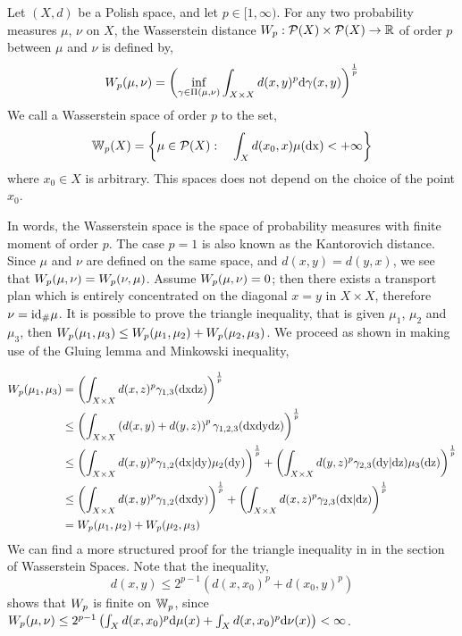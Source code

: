 \begin{definition}
	Let $(X,d)$ be a Polish space, and let $p\in[1,\infty)$. 
	For any two probability measures $\mu$, $\nu$ on $X$, the Wasserstein distance $W_{p}:\mathcal{P}(X)\times\mathcal{P}
	(X)\to\mathbb{R}$ of order $p$ between $\mu$ and $\nu$ is defined by,
	\begin{equation}
		W_{p}(\mu, \nu)=\left( \inf_{\gamma\in \Pi(\mu, \nu)}\int_{X\times X}d(x,y)^p\mathrm{d}\gamma(x,y) \right)^{\frac{1}{p}}
	\end{equation}
	We call a Wasserstein space of order $p$ to the set, \begin{equation}
	\mathbb{W}_{p}(X)=\left\lbrace \mu\in\mathcal{P}(X):\quad \int_{X}d(x_0,x)\mu(\mathrm{dx})<+\infty \right\rbrace
	\end{equation}
	where $x_0\in X$ is arbitrary. This spaces does not depend on the choice of the point $x_0$. 
\end{definition}
In words, the Wasserstein space is the space of probability measures with finite moment of order $p$. The case $p=1$ is also known as the Kantorovich distance. Since $\mu$ and $\nu$ are defined on the same space, and $d(x,y)=d(y,x)$, we see that $W_{p}(\mu,\nu)=W_{p}(\nu,\mu)$. Assume $W_{p}(\mu, \nu)=0$; then there exists a transport plan which is entirely concentrated on the diagonal $x=y$ in $X\times X$, therefore $\nu={\mathrm{id}}_{\#} \mu$. It is possible to prove the triangle inequality, that is given $\mu_1$, $\mu_2$ and $\mu_3$, then $W_{p}(\mu_1,\mu_3)\leq W_{p}(\mu_1, \mu_2)+W_{p}(\mu_2, \mu_3)$. We proceed as shown in \cite{Villani2008OT} making use of the Gluing lemma and Minkowski inequality,

\begin{align}
	W_{p}(\mu_1, \mu_3)&=\left( \int_{X\times X}d(x,z)^p\gamma_{1,3}(\mathrm{dx}\mathrm{dz}) \right)^{\frac{1}{p}}\\
	&\leq\left( \int_{X\times X}\left( d(x,y)+d(y,z) \right)^p\gamma_{1,2,3}(\mathrm{dx}\mathrm{dy} \mathrm{dz}) \right)^{\frac{1}{p}}\\
	&\leq\left( \int_{X\times X}d(x,y)^p\gamma_{1,2}(\mathrm{dx} |\mathrm{dy})\mu_2(\mathrm{dy}) \right)^{\frac{1}{p}}+\left( \int_{X\times X}d(y,z)^p\gamma_{2,3}(\mathrm{dy}| \mathrm{dz})\mu_3(\mathrm{dz}) \right)^{\frac{1}{p}}\\
	&\leq\left( \int_{X\times X}d(x,y)^p\gamma_{1,2}(\mathrm{dx} \mathrm{dy}) \right)^{\frac{1}{p}}+\left( \int_{X\times X}d(x,z)^p\gamma_{2,3}(\mathrm{dx}|\mathrm{dz}) \right)^{\frac{1}{p}}\\
	&=W_{p}(\mu_1,\mu_2)+W_{p}(\mu_2,\mu_3)
\end{align} 
We can find a more structured proof for the triangle inequality in \cite{Santambrogio2015OT} in the section of Wasserstein Spaces.
Note that the inequality, 
\begin{equation}
	d(x,y)\leq 2^{p-1}\left(d(x, x_0)^p+d(x_0, y)^p\right)
\end{equation}
shows that $W_{p}$ is finite on $\mathbb{W}_{p}$, since $W_{p}(\mu,\nu)\leq 2^{p-1} \left( \int_{X}d(x, x_0)^p\mathrm{d}\mu(x)+\int_{X}d(x, x_0)^p\mathrm{d}\nu(x) \right)<\infty$.

